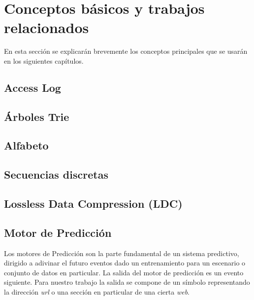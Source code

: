 \section[Conceptos Básicos]{Conceptos básicos y trabajos relacionados} \label{sec:Conceptos-Basicos}


En esta sección se explicarán brevemente los conceptos principales que se usarán en los siguientes capítulos.




\subsection{Access Log}\label{concept-accesslog}
	

\subsection{Árboles Trie} \label{concept-trie}

	


\subsection{Alfabeto} \label{concept-alphabet}
	

\subsection{Secuencias discretas}\label{concept-discret-seq}
	


\subsection{Lossless Data Compression (LDC)} \label{concept-LDC}
	


\subsection{Motor de Predicción}\label{concept-enginepredict}

	Los motores de Predicción son la parte fundamental de un sistema predictivo, dirigido a adivinar el futuro eventos dado un entrenamiento para un escenario o conjunto de datos en particular. La salida del motor de predicción es un evento siguiente. Para nuestro trabajo la salida se compone de un símbolo representando la dirección \emph{url} o una sección en particular de una cierta \emph{web}. 

